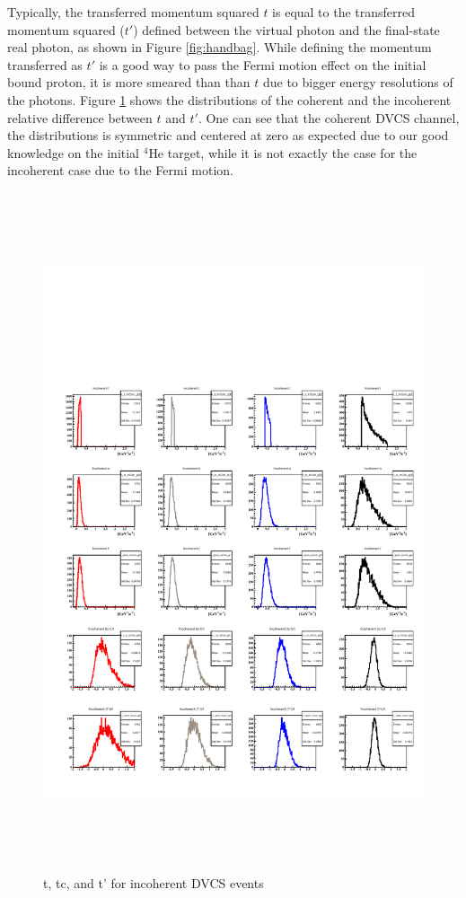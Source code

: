 \documentclass[a4paper,11pt,twoside]{article}
\begin{document}
Typically, the transferred momentum squared $t$ is equal to the transferred 
momentum squared ($t'$) defined between the virtual photon and the final-state 
real photon, as shown in Figure \ref{fig:handbag}.  While defining the momentum 
transferred as $t'$ is a good way to pass the Fermi motion effect on the 
initial bound proton, it is more smeared than than $t$ due to bigger energy 
resolutions of the photons. Figure \ref{fig:tprime} shows the distributions of 
the coherent and the incoherent relative difference between $t$ and $t'$. One 
can see that the coherent DVCS channel, the distributions is symmetric and 
centered at zero as expected due to our good knowledge on the initial $^4$He 
target, while it is not exactly the case for the incoherent case due to the 
Fermi motion.\\            


\begin{figure}[h!]
\includegraphics[height=20.0cm]{fig/bins_InCoh_t_tc_tprime.pdf}
\caption{t, tc, and t' for incoherent DVCS events}
\label{fig:tprime}
\end{figure}
\end{document}
